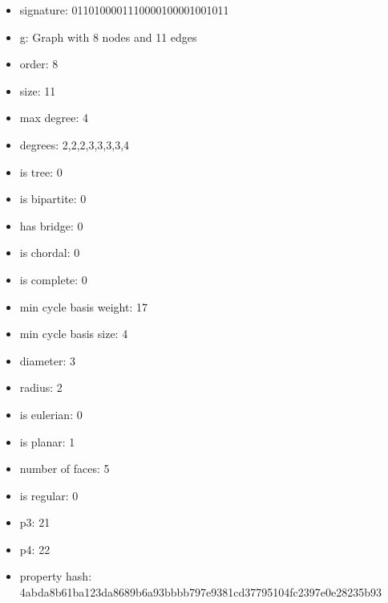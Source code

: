 \begin{itemize}
\item signature: 0110100001110000100001001011
\item g: Graph with 8 nodes and 11 edges
\item order: 8
\item size: 11
\item max degree: 4
\item degrees: 2,2,2,3,3,3,3,4
\item is tree: 0
\item is bipartite: 0
\item has bridge: 0
\item is chordal: 0
\item is complete: 0
\item min cycle basis weight: 17
\item min cycle basis size: 4
\item diameter: 3
\item radius: 2
\item is eulerian: 0
\item is planar: 1
\item number of faces: 5
\item is regular: 0
\item p3: 21
\item p4: 22
\item property hash: 4abda8b61ba123da8689b6a93bbbb797e9381cd37795104fc2397e0e28235b93
\end{itemize}
\newpage
\begin{figure}
\end{figure}
